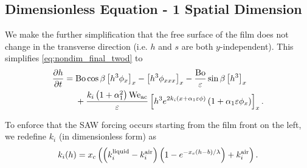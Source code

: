 \subsection{Dimensionless Equation - 1 Spatial Dimension}
\begin{frame}
    We make the further simplification that the free surface of the film does not change
    in the transverse direction (i.e.\! $h$ and $s$ are both $y$-independent). 
    This simplifies \cref{eq:nondim_final_twod} to 
    \begin{equation}
        \begin{aligned}
            \frac{\partial h}{\partial t} = \; &\mathrm{Bo}\cos\beta \left[ h^3 \phi_x \right]_x - \left[ h^3 \phi_{xxx} \right]_{x} - \frac{\mathrm{Bo}}{\varepsilon} \sin\beta \left[ h^3 \right]_{x} \\  
            &+\frac{k_i \left( 1 + \alpha_1^2 \right)\mathrm{We_{ac}}}{\varepsilon} \left[ h^3 e^{2k_i \left( x + \alpha_1 \varepsilon \phi \right)} \left( 1 + \alpha_1 \varepsilon \phi_x \right) \right]_x.
        \end{aligned} 
        \label{eq:nondim_final_oned}
    \end{equation}

    To enforce that the SAW forcing occurs starting from the film front on the left, we redefine 
    $k_i$ (in dimensionless form) as 
    \begin{equation*}
        k_i\!\left( h \right) = x_c \left( \left( k_i^{\text{liquid}} - k_i^{\text{air}} \right)\left( 1 - e^{-x_c(h-b)/\lambda} \right) + k_i^{\text{air}} \right).
        \label{eq:k_i}
    \end{equation*}
\end{frame}